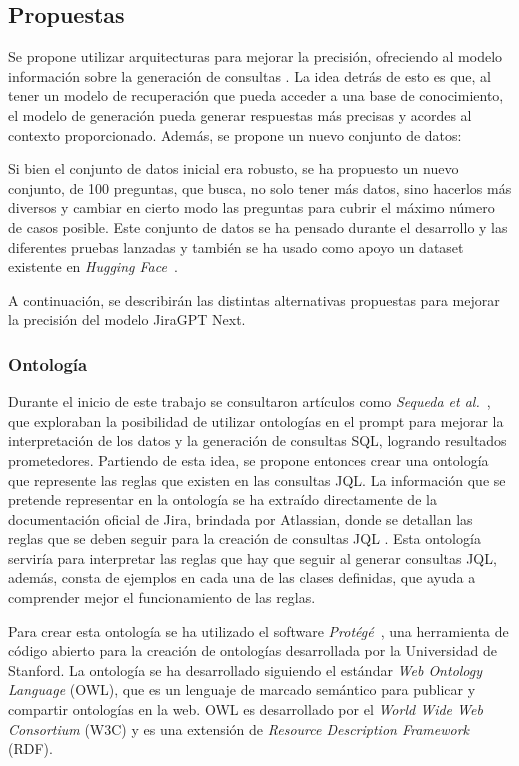 \subsection{Propuestas}
Se propone utilizar arquitecturas  para mejorar la precisión, ofreciendo al modelo información sobre la generación de consultas . La idea detrás de esto es que, al tener un modelo de recuperación que pueda acceder a una base de conocimiento, el modelo de generación pueda generar respuestas más precisas y acordes al contexto proporcionado. Además, se propone un nuevo conjunto de datos:

Si bien el conjunto de datos inicial era robusto, se ha propuesto un nuevo conjunto, de 100 preguntas, que busca, no solo tener más datos, sino hacerlos más diversos y cambiar en cierto modo las preguntas para cubrir el máximo número de casos posible. Este conjunto de datos se ha pensado durante el desarrollo y las diferentes pruebas lanzadas y también se ha usado como apoyo un dataset existente en \textit{Hugging Face}~\cite{datasetHF}.

A continuación, se describirán las distintas alternativas propuestas para mejorar la precisión del modelo JiraGPT Next.

\subsubsection{Ontología}
Durante el inicio de este trabajo se consultaron artículos como \textit{Sequeda et al.}~\cite{sequeda2023benchmark}, que exploraban la posibilidad de utilizar ontologías en el prompt para mejorar la interpretación de los datos y la generación de consultas SQL, logrando resultados prometedores. Partiendo de esta idea, se propone entonces crear una ontología que represente las reglas que existen en las consultas JQL. La información que se pretende representar en la ontología se ha extraído directamente de la documentación oficial de Jira, brindada por Atlassian, donde se detallan las reglas que se deben seguir para la creación de consultas JQL \cite{jiradocs}. Esta ontología serviría para interpretar las reglas que hay que seguir al generar consultas JQL, además, consta de ejemplos en cada una de las clases definidas, que ayuda a comprender mejor el funcionamiento de las reglas.

Para crear esta ontología se ha utilizado el software \textit{Protégé}~\cite{protege}, una herramienta de código abierto para la creación de ontologías desarrollada por la Universidad de Stanford. La ontología se ha desarrollado siguiendo el estándar \textit{Web Ontology Language} (OWL), que es un lenguaje de marcado semántico para publicar y compartir ontologías en la web. OWL es desarrollado por el \textit{World Wide Web Consortium} (W3C) y es una extensión de \textit{Resource Description Framework} (RDF).

